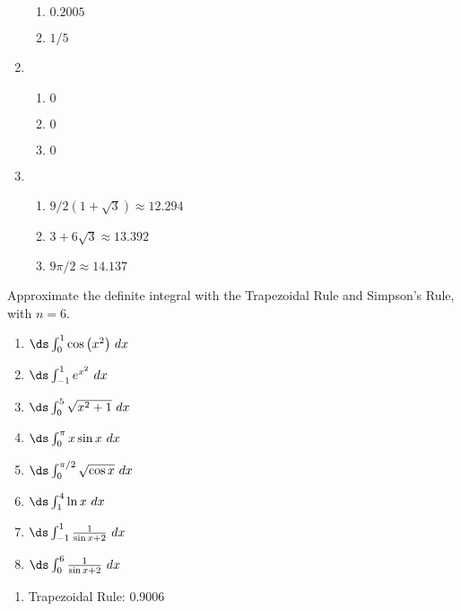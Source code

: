 \begin{enumialphparenastyle}
\begin{ex}
\begin{sol}
\begin{enumerate}
{\begin{enumerate}
\item		$0.2005$
\item		$1/5$
\end{enumerate}
}
\item {\begin{enumerate}
\item		$0$
\item		$0$
\item		$0$
\end{enumerate}
}
\item {\begin{enumerate}
\item		$9/2(1+\sqrt3)\approx 12.294$
\item		$3+6\sqrt3\approx 13.392$
\item		$9\pi/2\approx 14.137$
\end{enumerate}
}
\end{enumerate}
\end{sol}

\end{ex}


\begin{ex}
Approximate the definite integral with the Trapezoidal Rule and Simpson's Rule, with $n=6$.
\begin{enumerate}
\item {$\ds \int_{0}^{1} \cos \big(x^2\big) \ dx$}

\item {$\ds \int_{-1}^{1} e^{x^2} \ dx$}

\item {$\ds \int_{0}^{5} \sqrt{x^2+1} \ dx$}

\item {$\ds \int_{0}^{\pi} x\sin x \ dx$}

\item {$\ds \int_{0}^{\pi/2} \sqrt{\cos x} \ dx$}

\item {$\ds \int_{1}^{4} \ln x \ dx$}

\item {$\ds \int_{-1}^{1} \frac{1}{\sin x+2} \ dx$}

\item {$\ds \int_{0}^{6} \frac{1}{\sin x+2} \ dx$}

\end{enumerate}

\begin{sol}
\begin{enumerate}
\item {Trapezoidal Rule: 	$0.9006$

}
\end{enumerate}
\end{sol}
\end{ex}
\end{enumialphparenastyle}
